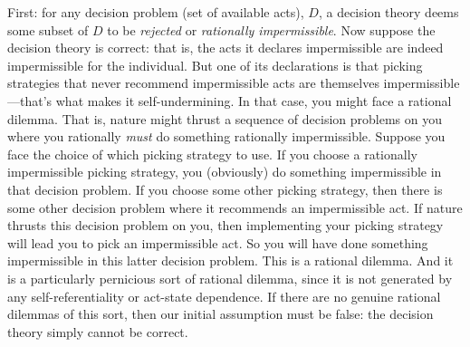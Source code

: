\documentclass[a4paper]{article}
\newenvironment{CCM rewritten}
{\begingroup\color{blue}} %
{\endgroup}              %
\begin{document}
{First: for any decision problem (set of available acts), $D$, a decision theory deems some subset of $D$ to be \textit{rejected} or \textit{rationally impermissible}. Now suppose the decision theory is correct: that is, the acts it declares impermissible are indeed impermissible for the individual. But one of its declarations is that picking strategies that never recommend impermissible acts are themselves impermissible---that's what makes it self-undermining. In that case, you might face a rational dilemma. That is, nature might thrust a sequence of decision problems on you where you rationally \textit{must} do something rationally impermissible. Suppose you face the choice of which picking strategy to use. If you choose a rationally impermissible picking strategy, you (obviously) do something impermissible in that decision problem. If you choose some other picking strategy, then there is some other decision problem where it recommends an impermissible act. If nature thrusts this decision problem on you, then implementing your picking strategy will lead you to pick an impermissible act. So you will have done something impermissible in this latter decision problem. This is a rational dilemma. And it is a particularly pernicious sort of rational dilemma, since it is not generated by any self-referentiality or act-state dependence. If there are no genuine rational dilemmas of this sort, then our initial assumption must be false: the decision theory simply cannot be correct.}



\end{document}
